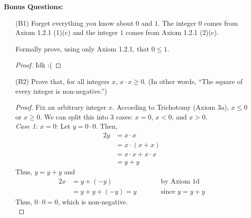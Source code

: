 \documentclass{article}
\begin{document}
    \newpage
    \textbf{Bonus Questions:}
    
    \begin{itemize}

    	\item [(B1)] Forget everything you know about $0$ and $1$.  The integer $0$ comes from Axiom 1.2.1 (1)(c) and the integer $1$ comes from Axiom     1.2.1 (2)(c).

    	Formally prove, using only Axiom 1.2.1, that $0 \le 1$.
                \begin{proof}
                    Idk :(
                \end{proof}
    	\item [(B2)] Prove that, for all integers $x$, $x \cdot x \ge 0$.  (In other words, ``The square of every integer is non-negative.'')
            \begin{proof}
                Fix an arbitrary integer $x$. According to Trichotomy (Axiom 3a), $x \le 0$ or $x \ge 0$. We can split this into 3 cases: $x = 0$, $x < 0$, and $x > 0$.\\
                
                \emph{Case 1: $x = 0$}: Let $y = 0 \cdot 0$. Then, 
                    \begin{alignat*}{2}
                        y &= x \cdot x \\
                        &= x \cdot (x + x) \\
                        &= x \cdot x + x \cdot x \\
                        &= y + y
                    \end{alignat*}
                    Thus, $y = y + y$ and
                    \begin{alignat*}{2}
                        x &= y + (\minus y)             &\qquad &\textrm{by Axiom 1d}  \\
                        &= y + y + (\minus y) = y           &\qquad &\textrm{since $y = y + y$} 
                    \end{alignat*} 
                    Thus, $0 \cdot 0 = 0$, which is non-negative.\\


\end{proof}
\end{itemize}
\end{document}
